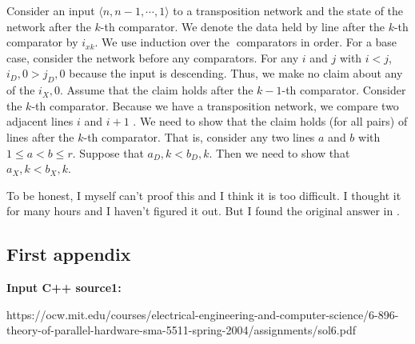 \documentclass[12pt,a4paper]{article}
\makeatletter
\newtheorem*{solution}{Solution}
\theoremstyle{definition}
\renewenvironment{solution}[1][Solution] {\par\pushQED{\qed}\normalfont\topsep6\p@\@plus6\p@\relax\trivlist\item[\hskip\labelsep\bfseries#1\@addpunct{.}]\ignorespaces}{\popQED\endtrivlist\@endpefalse} \makeatother
\makeatother
\begin{document}
\begin{solution}
Consider an input  $\langle n, n-1, \cdots, 1 \rangle$ to a transposition network and the state of the network
after the $k$-th comparator. We denote the data held by line after the $k$-th comparator by  $i_{x k}$. We use induction over the comparators in order.
For a base case, consider the network before any comparators. For any $i$ and $j$ with  
 $i<j$, $i_D,0 > j_D,0$
because the input is descending. Thus, we make no claim about any of the  $i_X,0 $.
Assume that the claim holds after the $k-1$-th comparator. Consider the $k$-th comparator. Because we
have a transposition network, we compare two adjacent lines $i$ and $i+1$ . We need to show that the
claim holds (for all pairs) of lines after the $k$-th comparator. That is, consider any two lines $a$ and $b$ with
 $1\leq a<b\leq r$. Suppose that $a_D,k < b_D,k $. Then we need to show that $a_X,k < b_X,k $. 
 
 To be honest, I myself can't proof this and I think it is too difficult. I thought it for many hours and I haven't figured it out. But I found the original answer in  \cite{ref1}.

\end{solution}
\newpage

\begin{appendices}
\section{First appendix}
\textcolor[rgb]{0.98,0.00,0.00}{\textbf{Input C++ source1:}}




%

\end{appendices}

\begin{thebibliography}{99}
     https://ocw.mit.edu/courses/electrical-engineering-and-computer-science/6-896-theory-of-parallel-hardware-sma-5511-spring-2004/assignments/sol6.pdf


\end{thebibliography}
\end{document}
